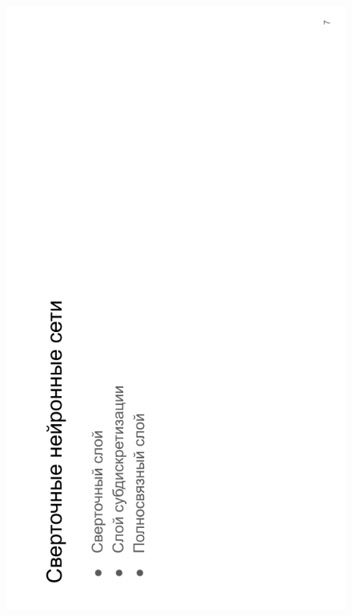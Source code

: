 \begin{figure}[H]
	\begin{center}
		\includegraphics[scale=0.7]{inc/img/slide7.png}
	\end{center}
\end{figure}
